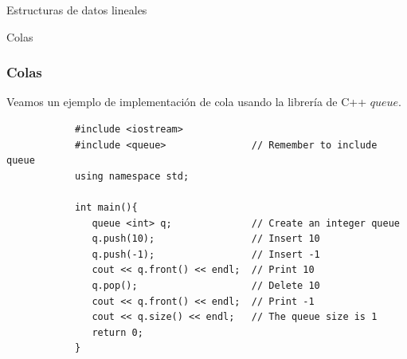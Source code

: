 \documentclass{beamer}
\begin{document}
\begin{section}{Estructuras de datos lineales}
\begin{subsection}{Colas}
	\begin{frame}[fragile]
		\frametitle{Colas}
		Veamos un ejemplo de implementación de cola usando la librería de C++ $queue$.
		\begin{lstlisting}
			#include <iostream>
			#include <queue>               // Remember to include queue
			using namespace std;

			int main(){
			   queue <int> q;              // Create an integer queue
			   q.push(10);                 // Insert 10
			   q.push(-1);                 // Insert -1
			   cout << q.front() << endl;  // Print 10
			   q.pop();                    // Delete 10
			   cout << q.front() << endl;  // Print -1
			   cout << q.size() << endl;   // The queue size is 1
			   return 0;
			}
		\end{lstlisting}
	\end{frame}

\end{subsection}
		
\end{section}
\end{document}
